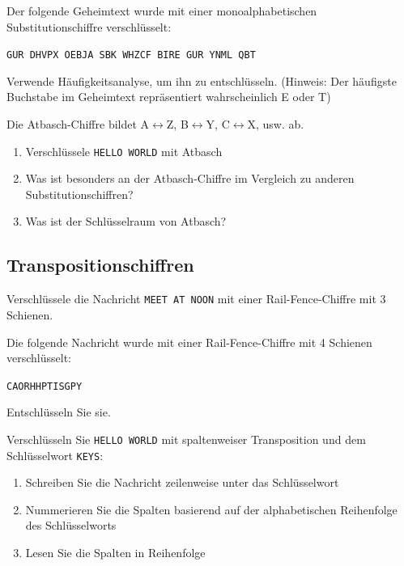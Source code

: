\documentclass[11pt,a4paper]{report}
\begin{document}
\begin{ex}
Der folgende Geheimtext wurde mit einer monoalphabetischen Substitutionschiffre verschlüsselt:

\texttt{GUR DHVPX OEBJA SBK WHZCF BIRE GUR YNML QBT}

Verwende Häufigkeitsanalyse, um ihn zu entschlüsseln. (Hinweis: Der häufigste Buchstabe im Geheimtext repräsentiert wahrscheinlich E oder T)
\end{ex}

\begin{ex}
Die Atbasch-Chiffre bildet A$\leftrightarrow$Z, B$\leftrightarrow$Y, C$\leftrightarrow$X, usw. ab.

\begin{enumerate}[label=\alph*)]
    \item Verschlüssele \texttt{HELLO WORLD} mit Atbasch
    \item Was ist besonders an der Atbasch-Chiffre im Vergleich zu anderen Substitutionschiffren?
    \item Was ist der Schlüsselraum von Atbasch?
\end{enumerate}
\end{ex}

\subsection{Transpositionschiffren}

\begin{ex}
Verschlüssele die Nachricht \texttt{MEET AT NOON} mit einer Rail-Fence-Chiffre mit 3 Schienen.
\end{ex}

\begin{ex}
Die folgende Nachricht wurde mit einer Rail-Fence-Chiffre mit 4 Schienen verschlüsselt:

\texttt{CAORHHPTISGPY}

Entschlüsseln Sie sie.
\end{ex}

\begin{ex}
Verschlüsseln Sie \texttt{HELLO WORLD} mit spaltenweiser Transposition und dem Schlüsselwort \texttt{KEYS}:
\begin{enumerate}[label=\alph*)]
    \item Schreiben Sie die Nachricht zeilenweise unter das Schlüsselwort
    \item Nummerieren Sie die Spalten basierend auf der alphabetischen Reihenfolge des Schlüsselworts
    \item Lesen Sie die Spalten in Reihenfolge
\end{enumerate}
\end{ex}
\end{document}
